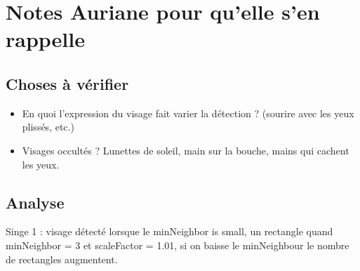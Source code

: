 \documentclass[a4paper,11pt]{article}
\begin{document}
\section{Notes Auriane pour qu'elle s'en rappelle}
    
    \subsection{Choses à vérifier}
	
	\begin{itemize}
	    \item En quoi l'expression du visage fait varier la détection ? (sourire avec les yeux plissés, etc.)
	    \item Visages occultés ? Lunettes de soleil, main sur la bouche, mains qui cachent les
		yeux.
	\end{itemize}

    \subsection{Analyse}

	Singe 1 : visage détecté lorsque le minNeighbor is small, un rectangle quand minNeighbor = 3 et
    	scaleFactor = 1.01, si on baisse le minNeighbour le nombre de rectangles augmentent.
\end{document}

